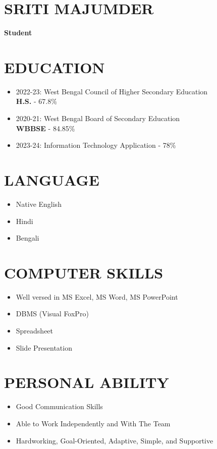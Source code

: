 \documentclass[12pt]{article}
\begin{document}
\hfill
\begin{minipage}{0.65\textwidth}
    \section*{SRITI MAJUMDER}
    \textbf{Student}
    
    \section*{EDUCATION}
    \begin{itemize}
        \item 2022-23: West Bengal Council of Higher Secondary Education \\
        \textbf{H.S.} - 67.8\%
        \item 2020-21: West Bengal Board of Secondary Education \\
        \textbf{WBBSE} - 84.85\%
        \item 2023-24: Information Technology Application - 78\%
    \end{itemize}
    
    \section*{LANGUAGE}
    \begin{itemize}
        \item Native English
        \item Hindi
        \item Bengali
    \end{itemize}
    
    \section*{COMPUTER SKILLS}
    \begin{itemize}
        \item Well versed in MS Excel, MS Word, MS PowerPoint
        \item DBMS (Visual FoxPro)
        \item Spreadsheet
        \item Slide Presentation
    \end{itemize}
    
    \section*{PERSONAL ABILITY}
    \begin{itemize}
        \item Good Communication Skills
        \item Able to Work Independently and With The Team
        \item Hardworking, Goal-Oriented, Adaptive, Simple, and Supportive
    \end{itemize}
    
\end{minipage}
\end{document}
